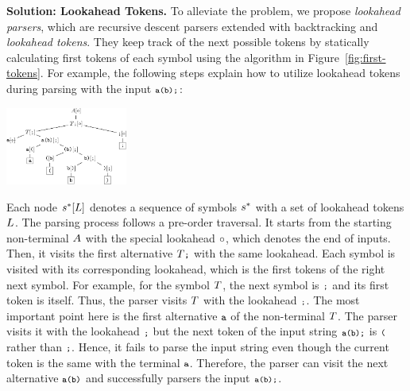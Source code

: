 \textbf{Solution: Lookahead Tokens.}
To alleviate the problem, we propose \textit{lookahead parsers},
which are recursive descent parsers extended with backtracking and
\textit{lookahead tokens}.  They keep track of the next possible
tokens by statically calculating first tokens of each symbol using the
algorithm in Figure~\ref{fig:first-tokens}.  For example, the
following steps explain how to utilize lookahead tokens during parsing
with the input \( \texttt{\footnotesize a(b);} \):
\begin{center}
  \includegraphics[width=0.3\textwidth]{img/laparser.png}
\end{center}
Each node \( s^*[L] \) denotes a sequence of symbols \( s^* \)
with a set of lookahead tokens \( L \).  The parsing process follows
a pre-order traversal.  It starts from the starting non-terminal \( A \)
with the special lookahead \( \circ \), which denotes the end of
inputs.  Then, it visits the first alternative \( T \texttt{\footnotesize;} \) with
the same lookahead.  Each symbol is visited with its corresponding
lookahead, which is the first tokens of the right next symbol.
For example, for the symbol \( T \), the next symbol is \( \texttt{\footnotesize;} \)
and its first token is itself.  Thus, the parser visits \( T \)
with the lookahead \( \texttt{\footnotesize;} \).  The most important point here
is the first alternative \( \texttt{\footnotesize a} \) of the
non-terminal \( T \).  The parser visits it with the lookahead \( \texttt{\footnotesize;} \)
but the next token of the input string \( \texttt{\footnotesize a(b);} \) is \( \texttt{\footnotesize(} \)
rather than \( \texttt{\footnotesize;} \).  Hence, it fails to parse the input string
even though the current token is the same with the terminal \( \texttt{\footnotesize a} \).
Therefore, the parser can visit the next alternative \( \texttt{\footnotesize a}\texttt{\footnotesize(}\texttt{\footnotesize b}\texttt{\footnotesize)} \)
and successfully parsers the input \( \texttt{\footnotesize a(b);} \).

